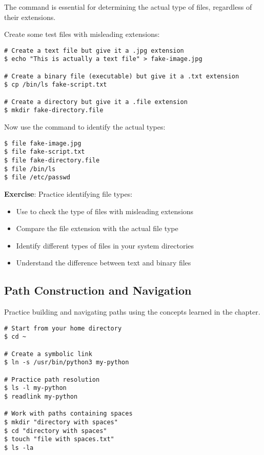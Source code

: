 The  command is essential for determining the actual type of files, regardless of their extensions.

Create some test files with misleading extensions:

\begin{lstlisting}[style=bashstyle]
# Create a text file but give it a .jpg extension
$ echo "This is actually a text file" > fake-image.jpg

# Create a binary file (executable) but give it a .txt extension
$ cp /bin/ls fake-script.txt

# Create a directory but give it a .file extension
$ mkdir fake-directory.file
\end{lstlisting}

Now use the  command to identify the actual types:

\begin{lstlisting}[style=bashstyle]
$ file fake-image.jpg
$ file fake-script.txt
$ file fake-directory.file
$ file /bin/ls
$ file /etc/passwd
\end{lstlisting}

\textbf{Exercise}: Practice identifying file types:
\begin{itemize}
    \item Use  to check the type of files with misleading extensions
    \item Compare the file extension with the actual file type
    \item Identify different types of files in your system directories
    \item Understand the difference between text and binary files
\end{itemize}

\subsection{Path Construction and Navigation}

Practice building and navigating paths using the concepts learned in the chapter.

\begin{lstlisting}[style=bashstyle]
# Start from your home directory
$ cd ~

# Create a symbolic link
$ ln -s /usr/bin/python3 my-python

# Practice path resolution
$ ls -l my-python
$ readlink my-python

# Work with paths containing spaces
$ mkdir "directory with spaces"
$ cd "directory with spaces"
$ touch "file with spaces.txt"
$ ls -la
\end{lstlisting}


